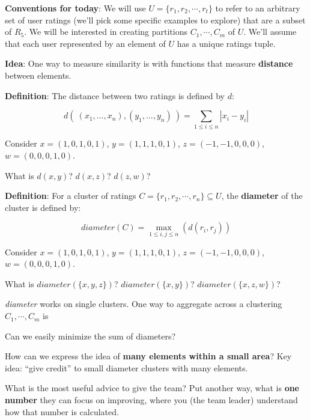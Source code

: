 \documentclass[12pt, oneside]{article}
\begin{document}
{\bf Conventions for today}: We will use $U = \{r_1, r_2, \cdots, r_t\}$ to refer to an arbitrary set of user ratings (we'll pick some specific examples to explore) that are a subset of $R_5$. We will be interested in creating partitions $C_1, \cdots, C_m$ of $U$. We'll assume that each user represented by an element of $U$ has a unique ratings tuple.

{\bf Idea}: One way to measure similarity is with functions that measure {\bf distance} between elements.

{\bf Definition}: The distance between two ratings is defined by $d$:

$$d(~ (x_1, \ldots, x_n) , (y_1, \ldots, y_n) ~) =  \displaystyle \sum_{1 \leq i \leq n} | x_i - y_i |$$

Consider $x = (1, 0, 1, 0, 1)$, $y = (1, 1, 1, 0, 1)$, $z = (-1, -1, 0, 0, 0)$, $w = (0, 0, 0, 1, 0)$.

What is $d(x, y)$? $d(x, z)$? $d(z, w)$?

\vfill

\newpage

{\bf Definition}: For a cluster of ratings $C = \{r_1, r_2, \cdots, r_n \} \subseteq U$, the {\bf diameter} of the cluster is defined by:

$$\textit{diameter}(C) = \max_{1 \leq i, j \leq n} (d(r_i, r_j))$$ 

Consider $x = (1, 0, 1, 0, 1)$, $y = (1, 1, 1, 0, 1)$, $z = (-1, -1, 0, 0, 0)$, $w = (0, 0, 0, 1, 0)$.

What is $\textit{diameter}(\{x, y, z\})$? $\textit{diameter}(\{x, y\})$? $\textit{diameter}(\{x, z, w\})$?


\vfill

\textit{diameter} works on single clusters. One way to aggregate across a
clustering $C_1, \cdots, C_m$ is \underline{\hspace{15em}}

Can we easily minimize the sum of diameters?

\vfill

How can we express the idea of {\bf many elements within a small area}? Key idea: ``give credit'' to small diameter clusters with many elements.

\vfill

What is the most useful advice to give the team? Put another way, what is {\bf one number} they can focus on improving, where you (the team leader) understand how that number is calculated.

\vfill
\end{document}
